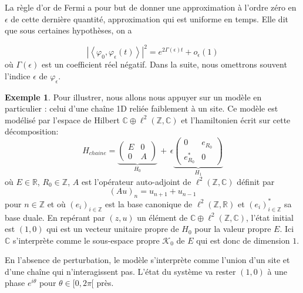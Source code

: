 \documentclass[12pt,openany,a4paper, titlepage]{article}
\newcommand{\lp}{\left(}
\newcommand{\rp}{\right)}
\newcommand{\la}{\left\langle}
\newcommand{\ra}{\right\rangle}
\newcommand{\R}{\mathbb{R}}
\newcommand{\C}{\mathbb{C}}
\newcommand{\Z}{\mathbb{Z}}
\newcommand{\vp}{\varphi}
\theoremstyle{definition}
\theoremstyle{definition}
\theoremstyle{definition}
\newtheorem{ex}{Exemple}
\theoremstyle{definition}
\theoremstyle{definition}
\theoremstyle{definition}
\begin{document}
La règle d'or de Fermi a pour but de donner une approximation à l'ordre zéro en $\epsilon$  de cette dernière quantité, approximation qui est uniforme en temps. Elle dit que sous certaines hypothèses, on a

\begin{equation}
    |\la \vp_0, \vp_\epsilon(t) \ra |^2 = e^{2\Gamma(\epsilon)t} + o_\epsilon(1)
\end{equation}
où $\Gamma(\epsilon)$ est un coefficient réel négatif.  Dans la suite, nous omettrons souvent l'indice $\epsilon$ de $\vp_\epsilon$.


\begin{ex}
Pour illustrer, nous allons nous appuyer sur un modèle en particulier : celui d'une chaîne 1D reliée faiblement à un site. Ce modèle est modélisé par l'espace de Hilbert $\C\oplus\ell^2(\Z,\C)$ et l'hamiltonien écrit sur cette décomposition:
\begin{equation}
    H_{chaine} = \underbrace{\begin{pmatrix}
E & 0 \\
0 & A 
\end{pmatrix}}_{H_0} \,+\, \epsilon
\underbrace{\begin{pmatrix}
0        & e_{R_0} \\
e_{R_0}^* &  0
\end{pmatrix}}_{H_1}
\end{equation}
où $E\in\R$, $R_0\in\Z$, $A$ est l'opérateur auto-adjoint de $\ell^2(\Z,\C)$ définit par 
\begin{equation}
    (Au)_n = u_{n+1} + u_{n-1}
\end{equation}
pour $n\in\Z$ et où $\lp e_i\rp_{i\in\Z}$ est la base canonique de $\ell^2(\Z,\R)$ et $\lp e_i\rp_{i\in\Z}^*$ sa base duale. En repérant par $(z,u)$ un élément de $\C\oplus\ell^2(\Z,\C)$, l'état initial est $(1,0)$ qui est un vecteur unitaire propre de $H_0$ pour la valeur propre $E$. Ici $\C$ s'interprète comme le sous-espace propre $\mathcal{K}_0$ de $E$ qui est donc de dimension $1$.

En l'absence de perturbation, le modèle s'interprète comme l'union d'un site et d'une chaîne qui n'interagissent pas. L'état du système va rester $(1,0)$ à une phase $e^{i\theta}$ pour $\theta\in[0,2\pi[$ près. 


\end{ex}
\end{document}
